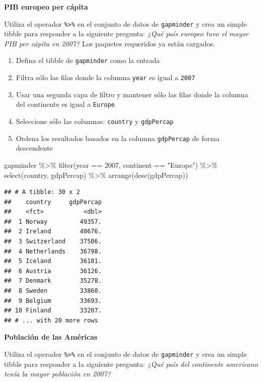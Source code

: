 \documentclass[
]{book}
\newenvironment{Shaded}{\begin{snugshade}}{\end{snugshade}}
\newcommand{\DecValTok}[1]{\textcolor[rgb]{0.00,0.00,0.81}{#1}}
\newcommand{\FunctionTok}[1]{\textcolor[rgb]{0.00,0.00,0.00}{#1}}
\newcommand{\NormalTok}[1]{#1}
\newcommand{\SpecialCharTok}[1]{\textcolor[rgb]{0.00,0.00,0.00}{#1}}
\newcommand{\StringTok}[1]{\textcolor[rgb]{0.31,0.60,0.02}{#1}}
\providecommand{\tightlist}{%
  \setlength{\itemsep}{0pt}\setlength{\parskip}{0pt}}
\begin{document}
\textbf{PIB europeo per cápita}

Utiliza el operador \texttt{\%\textgreater{}\%} en el conjunto de datos de \texttt{gapminder} y crea un simple tibble para responder a la siguiente pregunta: \emph{¿Qué país europeo tuvo el mayor PIB per cápita en 2007?} Los paquetes requeridos ya están cargados.

\begin{enumerate}
\def\labelenumi{\arabic{enumi}.}
\tightlist
\item
  Defina el tibble de \texttt{gapminder} como la entrada
\item
  Filtra sólo las filas donde la columna \texttt{year} es igual a \texttt{2007}
\item
  Usar una segunda capa de filtro y mantener sólo las filas donde la columna del continente es igual a \texttt{Europe}
\item
  Seleccione sólo las columnas: \texttt{country} y \texttt{gdpPercap}
\item
  Ordena los resultados basados en la columna \texttt{gdpPercap} de forma descendente
\end{enumerate}

\begin{Shaded}
\begin{Highlighting}[]
\NormalTok{gapminder }\SpecialCharTok{\%\textgreater{}\%}
  \FunctionTok{filter}\NormalTok{(year }\SpecialCharTok{==} \DecValTok{2007}\NormalTok{, continent }\SpecialCharTok{==} \StringTok{"Europe"}\NormalTok{) }\SpecialCharTok{\%\textgreater{}\%}
  \FunctionTok{select}\NormalTok{(country, gdpPercap) }\SpecialCharTok{\%\textgreater{}\%}
  \FunctionTok{arrange}\NormalTok{(}\FunctionTok{desc}\NormalTok{(gdpPercap))}
\end{Highlighting}
\end{Shaded}

\begin{verbatim}
## # A tibble: 30 x 2
##    country     gdpPercap
##    <fct>           <dbl>
##  1 Norway         49357.
##  2 Ireland        40676.
##  3 Switzerland    37506.
##  4 Netherlands    36798.
##  5 Iceland        36181.
##  6 Austria        36126.
##  7 Denmark        35278.
##  8 Sweden         33860.
##  9 Belgium        33693.
## 10 Finland        33207.
## # ... with 20 more rows
\end{verbatim}

\textbf{Población de las Américas}

Utiliza el operador \texttt{\%\textgreater{}\%} en el conjunto de datos de \texttt{gapminder} y crea un simple tibble para responder a la siguiente pregunta: \emph{¿Qué país del continente americano tenía la mayor población en 2007?}
\end{document}
